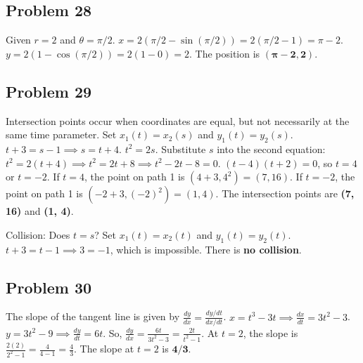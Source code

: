 \documentclass{article}
\begin{document}
\subsection*{Problem 28}
Given $r=2$ and $\theta=\pi/2$.
$x = 2(\pi/2 - \sin(\pi/2)) = 2(\pi/2 - 1) = \pi - 2$.
$y = 2(1 - \cos(\pi/2)) = 2(1 - 0) = 2$.
The position is $\mathbf{(\pi-2, 2)}$.

\subsection*{Problem 29}
Intersection points occur when coordinates are equal, but not necessarily at the same time parameter.
Set $x_1(t) = x_2(s)$ and $y_1(t) = y_2(s)$.
$t+3 = s-1 \implies s = t+4$.
$t^2 = 2s$.
Substitute $s$ into the second equation: $t^2 = 2(t+4) \implies t^2 = 2t+8 \implies t^2 - 2t - 8 = 0$.
$(t-4)(t+2) = 0$, so $t=4$ or $t=-2$.
If $t=4$, the point on path 1 is $(4+3, 4^2) = (7, 16)$.
If $t=-2$, the point on path 1 is $(-2+3, (-2)^2) = (1, 4)$.
The intersection points are \textbf{(7, 16)} and \textbf{(1, 4)}.

Collision: Does $t=s$? Set $x_1(t)=x_2(t)$ and $y_1(t)=y_2(t)$.
$t+3 = t-1 \implies 3 = -1$, which is impossible.
There is \textbf{no collision}.

\subsection*{Problem 30}
The slope of the tangent line is given by $\frac{dy}{dx} = \frac{dy/dt}{dx/dt}$.
$x = t^3 - 3t \implies \frac{dx}{dt} = 3t^2 - 3$.
$y = 3t^2 - 9 \implies \frac{dy}{dt} = 6t$.
So, $\frac{dy}{dx} = \frac{6t}{3t^2 - 3} = \frac{2t}{t^2-1}$.
At $t=2$, the slope is $\frac{2(2)}{2^2-1} = \frac{4}{4-1} = \frac{4}{3}$.
The slope at $t=2$ is $\mathbf{4/3}$.

\newpage
\end{document}
